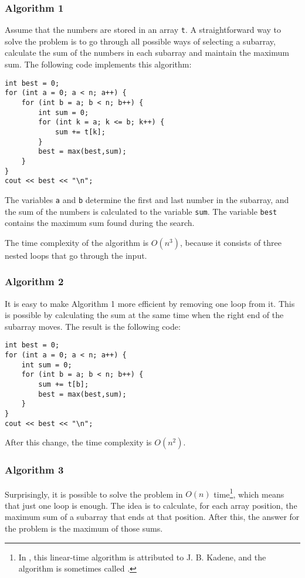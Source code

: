 \subsubsection{Algorithm 1}

Assume that the numbers are stored in
an array \texttt{t}.
A straightforward way to solve the problem
is to go through all possible ways of
selecting a subarray, calculate the sum of
the numbers in each subarray and maintain
the maximum sum.
The following code implements this algorithm:

\begin{lstlisting}
int best = 0;
for (int a = 0; a < n; a++) {
    for (int b = a; b < n; b++) {
        int sum = 0;
        for (int k = a; k <= b; k++) {
            sum += t[k];
        }
        best = max(best,sum);
    }
}
cout << best << "\n";
\end{lstlisting}

The variables \texttt{a} and \texttt{b} determine the first and last
number in the subarray,
and the sum of the numbers is calculated to the variable \texttt{sum}.
The variable \texttt{best} contains the maximum sum found during the search.

The time complexity of the algorithm is $O(n^3)$,
because it consists of three nested loops 
that go through the input.

\subsubsection{Algorithm 2}

It is easy to make Algorithm 1 more efficient
by removing one loop from it.
This is possible by calculating the sum at the same
time when the right end of the subarray moves.
The result is the following code:

\begin{lstlisting}
int best = 0;
for (int a = 0; a < n; a++) {
    int sum = 0;
    for (int b = a; b < n; b++) {
        sum += t[b];
        best = max(best,sum);
    }
}
cout << best << "\n";
\end{lstlisting}
After this change, the time complexity is $O(n^2)$.

\subsubsection{Algorithm 3}

Surprisingly, it is possible to solve the problem
in $O(n)$ time\footnote{In \cite{ben86}, this linear-time algorithm
is attributed to J. B. Kadene, and the algorithm is sometimes
called  .}, which means
that just one loop is enough.
The idea is to calculate, for each array position,
the maximum sum of a subarray that ends at that position.
After this, the answer for the problem is the
maximum of those sums.

